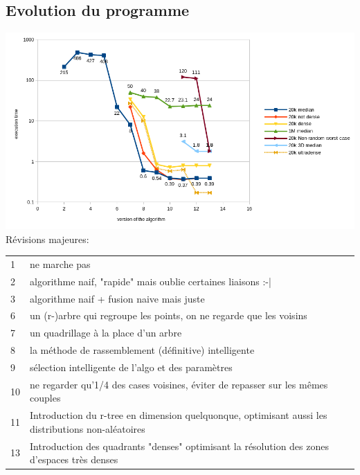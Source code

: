 \documentclass[a4paper,11pt]{article}
\begin{document}
\begin{enumerate}
\section{Evolution du programme}
\includegraphics[scale=0.7]{perf_version_algo.png}
\bigbreak
Révisions majeures:\\
\begin{tabular}{ll}
   1 & ne marche pas \\
   2 &  algorithme naif, "rapide" mais oublie certaines liaisons :-|\\
   3 & algorithme naif + fusion naive mais juste\\
   6 & un (r-)arbre qui regroupe les points, on ne regarde que les voisins\\
   7 & un quadrillage à la place d'un arbre\\
   8 & la méthode de rassemblement (définitive) intelligente\\
   9 & sélection intelligente de l'algo et des paramètres\\
   10 & ne regarder qu'1/4 des cases voisines, éviter de repasser sur les mêmes couples\\
   11 & Introduction du r-tree en dimension quelquonque, optimisant aussi les distributions non-aléatoires\\
   13 & Introduction des quadrants "denses" optimisant la résolution des zones d'espaces très denses
\end{tabular}




















\end{enumerate}
\end{document}
